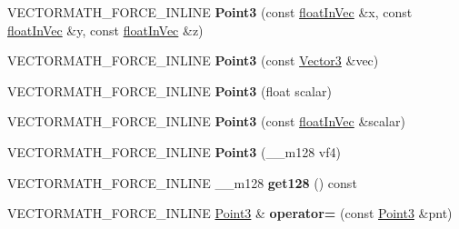\begin{DoxyCompactItemize}
\item 
\mbox{\label{classVectormath_1_1Aos_1_1Point3_a99f3395e4fe247d658ad402020b445e9}} 
V\+E\+C\+T\+O\+R\+M\+A\+T\+H\+\_\+\+F\+O\+R\+C\+E\+\_\+\+I\+N\+L\+I\+NE {\bfseries Point3} (const \hyperlink{classVectormath_1_1floatInVec}{float\+In\+Vec} \&x, const \hyperlink{classVectormath_1_1floatInVec}{float\+In\+Vec} \&y, const \hyperlink{classVectormath_1_1floatInVec}{float\+In\+Vec} \&z)
\item 
\mbox{\label{classVectormath_1_1Aos_1_1Point3_a7ede6b811d45cdbe2cc50a5c2c4d5615}} 
V\+E\+C\+T\+O\+R\+M\+A\+T\+H\+\_\+\+F\+O\+R\+C\+E\+\_\+\+I\+N\+L\+I\+NE {\bfseries Point3} (const \hyperlink{classVectormath_1_1Aos_1_1Vector3}{Vector3} \&vec)
\item 
\mbox{\label{classVectormath_1_1Aos_1_1Point3_a438b318e3c3209422e75f6305873c349}} 
V\+E\+C\+T\+O\+R\+M\+A\+T\+H\+\_\+\+F\+O\+R\+C\+E\+\_\+\+I\+N\+L\+I\+NE {\bfseries Point3} (float scalar)
\item 
\mbox{\label{classVectormath_1_1Aos_1_1Point3_a76ef26043aae56eae15ec260f7862d37}} 
V\+E\+C\+T\+O\+R\+M\+A\+T\+H\+\_\+\+F\+O\+R\+C\+E\+\_\+\+I\+N\+L\+I\+NE {\bfseries Point3} (const \hyperlink{classVectormath_1_1floatInVec}{float\+In\+Vec} \&scalar)
\item 
\mbox{\label{classVectormath_1_1Aos_1_1Point3_a988043c1c34940ef33ff2bb59afaed4c}} 
V\+E\+C\+T\+O\+R\+M\+A\+T\+H\+\_\+\+F\+O\+R\+C\+E\+\_\+\+I\+N\+L\+I\+NE {\bfseries Point3} (\+\_\+\+\_\+m128 vf4)
\item 
\mbox{\label{classVectormath_1_1Aos_1_1Point3_add25ef6b30238421fc8ef3b9d4aa3325}} 
V\+E\+C\+T\+O\+R\+M\+A\+T\+H\+\_\+\+F\+O\+R\+C\+E\+\_\+\+I\+N\+L\+I\+NE \+\_\+\+\_\+m128 {\bfseries get128} () const
\item 
\mbox{\label{classVectormath_1_1Aos_1_1Point3_ac73c3adfeb7fcc847e6d1a2afde4b85b}} 
V\+E\+C\+T\+O\+R\+M\+A\+T\+H\+\_\+\+F\+O\+R\+C\+E\+\_\+\+I\+N\+L\+I\+NE \hyperlink{classVectormath_1_1Aos_1_1Point3}{Point3} \& {\bfseries operator=} (const \hyperlink{classVectormath_1_1Aos_1_1Point3}{Point3} \&pnt)

\end{DoxyCompactItemize}
